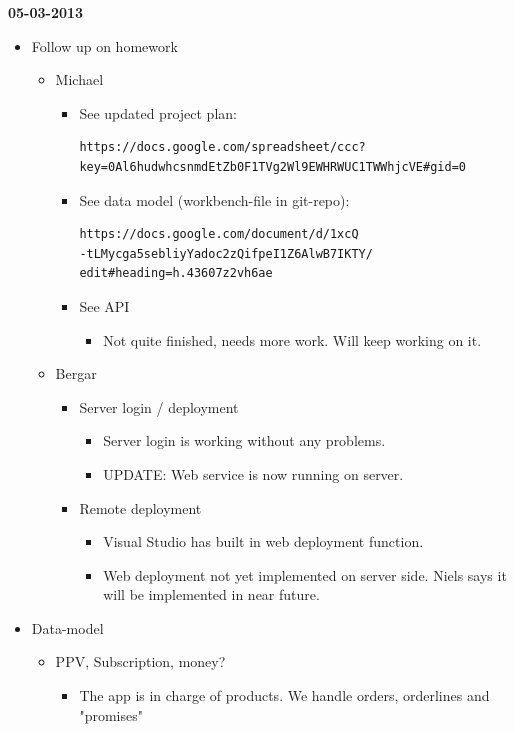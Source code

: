 \documentclass[11pt]{article}
\begin{document}
\begin{landscape}
\begin{multicols}{2}
\textbf{05-03-2013}
\begin{itemize}
\item Follow up on homework
\begin{itemize}
\item Michael
\begin{itemize}
\item See updated project plan: \begin{verbatim}
https://docs.google.com/spreadsheet/ccc?
key=0Al6hudwhcsnmdEtZb0F1TVg2Wl9EWHRWUC1TWWhjcVE#gid=0
\end{verbatim}
\item See data model (workbench-file in git-repo): \begin{verbatim}
https://docs.google.com/document/d/1xcQ
-tLMycga5sebliyYadoc2zQifpeI1Z6AlwB7IKTY/
edit#heading=h.43607z2vh6ae 
\end{verbatim}
\item See API
\begin{itemize}
\item Not quite finished, needs more work. Will keep working on it.
\end{itemize}
\end{itemize}
\item Bergar
\begin{itemize}
\item Server login / deployment
\begin{itemize}
\item Server login is working without any problems.
\item UPDATE: Web service is now running on server.
\end{itemize}
\item Remote deployment
\begin{itemize}
\item Visual Studio has built in web deployment function.
\item Web deployment not yet implemented on server side. Niels says it will be implemented in near future.
\end{itemize}
\end{itemize}
\end{itemize}
\item Data-model
\begin{itemize}
\item PPV, Subscription, money?
\begin{itemize}
\item The app is in charge of products. We handle orders, orderlines and "promises"
\end{itemize}

\end{itemize}
\end{itemize}
\end{multicols}
\end{landscape}
\end{document}
